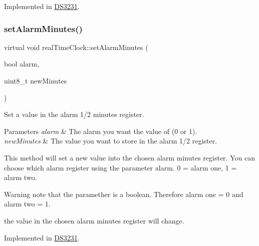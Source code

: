Implemented in \mbox{\hyperlink{class_d_s3231_a0bcc7e2285869ffbe29d19c593f5a447}{D\+S3231}}.

\mbox{\label{classreal_time_clock_a53ffba88cd87d05af58288fb4fc589b5}} 
\subsubsection{\texorpdfstring{set\+Alarm\+Minutes()}{setAlarmMinutes()}}
{\footnotesize\ttfamily virtual void real\+Time\+Clock\+::set\+Alarm\+Minutes (\begin{DoxyParamCaption}\item[{bool}]{alarm,  }\item[{uint8\+\_\+t}]{new\+Minutes }\end{DoxyParamCaption})\hspace{0.3cm}{\ttfamily [pure virtual]}}



Set a value in the alarm 1/2 minutes register. 


\begin{DoxyParams}{Parameters}
{\em alarm} & The alarm you want the value of (0 or 1). \\
\hline
{\em new\+Minutes} & The value you want to store in the alarm 1/2 register.\\
\hline
\end{DoxyParams}
This method will set a new value into the chosen alarm minutes register. You can choose which alarm register using the parameter alarm. 0 = alarm one, 1 = alarm two. \begin{DoxyWarning}{Warning}
note that the paramether is a boolean. Therefore alarm one = 0 and alarm two = 1. 

the value in the chosen alarm minutes register will change. 
\end{DoxyWarning}


Implemented in \mbox{\hyperlink{class_d_s3231_a9c1f5b183c24f3062c1c8c299f46023c}{D\+S3231}}.

\mbox{\label{classreal_time_clock_a448cbe8ab7f6649ee32eeb415721707f}} 
